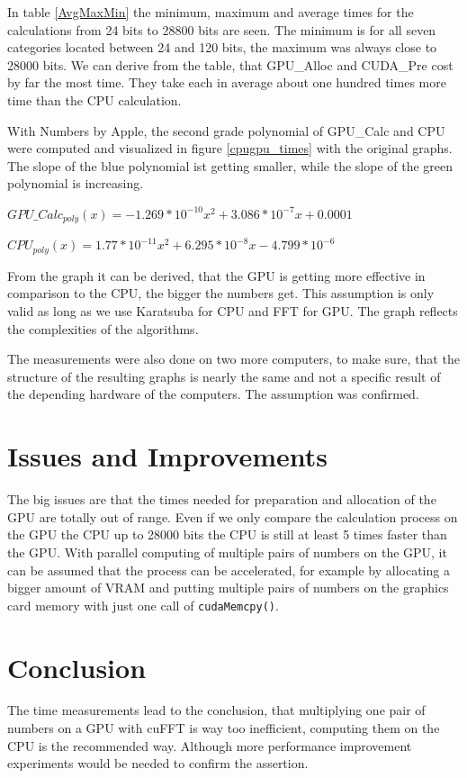 \documentclass[12pt,a4paper]{article}
\begin{document}
In table \ref{AvgMaxMin} the minimum, maximum and average times for the calculations from 24 bits to 28800 bits are seen. The minimum is for all seven categories located between 24 and 120 bits, the maximum was always close to 28000 bits. We can derive from the table, that GPU\_Alloc and CUDA\_Pre cost by far the most time. They take each in average about one hundred times more time than the CPU calculation.

 With Numbers by Apple, the second grade polynomial of GPU\_Calc and CPU were computed and visualized in figure \ref{cpugpu_times} with the original graphs. The slope of the blue polynomial ist getting smaller, while the slope of the green polynomial is increasing.

\begin{center}
    $GPU\_Calc_{poly}(x) = -1.269*10^{-10}x^2 + 3.086*10^{-7}x + 0.0001$
\end{center}

\begin{center}
    $CPU_{poly}(x) = 1.77*10^{-11}x^2 + 6.295*10^{-8}x - 4.799*10^{-6}$
\end{center}

From the graph it can be derived, that the GPU is getting more effective in comparison to the CPU, the bigger the numbers get. This assumption is only valid as long as we use Karatsuba for CPU and FFT for GPU. The graph reflects the complexities of the algorithms.

The measurements were also done on two more computers, to make sure, that the structure of the resulting graphs is nearly the same and not a specific result of the depending hardware of the computers. The assumption was confirmed.


\section{Issues and Improvements}
The big issues are that the times needed for preparation and allocation of the GPU are totally out of range. Even if we only compare the calculation process on the GPU the CPU up to 28000 bits the CPU is still at least 5 times faster than the GPU. With parallel computing of multiple pairs of numbers on the GPU, it can be assumed that the process can be accelerated, for example by allocating a bigger amount of VRAM and putting multiple pairs of numbers on the graphics card memory with just one call of \texttt{cudaMemcpy()}.

\section{Conclusion}
The time measurements lead to the conclusion, that multiplying one pair of numbers on a GPU with cuFFT is way too inefficient, computing them on the CPU is the recommended way. Although more performance improvement experiments would be needed to  confirm the assertion.


\end{document}
